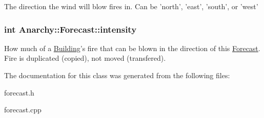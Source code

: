 The direction the wind will blow fires in. Can be 'north', 'east', 'south', or 'west' 

\hypertarget{classAnarchy_1_1Forecast_a18d05c207ab1e31e06ecdc5781f50499}{
\subsubsection[{intensity}]{\setlength{\rightskip}{0pt plus 5cm}int Anarchy\-::\-Forecast\-::intensity}}\label{classAnarchy_1_1Forecast_a18d05c207ab1e31e06ecdc5781f50499}


How much of a \hyperlink{classAnarchy_1_1Building}{Building}'s fire that can be blown in the direction of this \hyperlink{classAnarchy_1_1Forecast}{Forecast}. Fire is duplicated (copied), not moved (transfered). 



The documentation for this class was generated from the following files\-:\begin{DoxyCompactItemize}
\item 
forecast.\-h\item 
forecast.\-cpp\end{DoxyCompactItemize}
